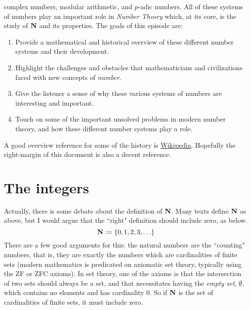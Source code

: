 \documentclass[11pt,oneside]{amsart}
\begin{document}
complex numbers, modular arithmetic, and $p$-adic numbers.  
All of these systems of numbers play an important role in {\em Number Theory} 
which, at its core, is the study of $\mathbf{N}$ and its properties.  
The goals of this episode are:
\begin{enumerate}
	\item Provide a mathematical and historical overview of these different number 
        systems and their development.
	\item Highlight the challenges and obstacles that mathematicians and 
        civilizations faced with new concepts of \emph{number}.
	\item Give the listener a sense of why these various systems of numbers are 
        interesting and important.
	\item Touch on some of the important unsolved problems in modern number 
        theory, and how these different number systems play a role.
\end{enumerate} 
A good overview reference for some of the history is 
  \href{https://en.wikipedia.org/wiki/Number}{Wikipedia}.
Hopefully the right-margin of this document is also a decent reference.

\section{The integers}
Actually, there is some debate about the definition of $\mathbf{N}$.  
Many texts define $\mathbf{N}$ as above, 
  but I would argue that the ``right" definition should include zero, as below.
\[\mathbf{N}:=\{0,1,2,3,\ldots\}\]
There are a few good arguments for this: 
  the natural numbers are the ``counting" numbers, 
  that is, they are exactly the numbers which
  are cardinalities of finite sets
  (modern mathematics is predicated on axiomatic set theory, 
  typically using the ZF or ZFC axioms).
In set theory, one of the axioms is that the intersection of two sets should 
  always be a set, and that necessitates having the {\em empty set}, 
  $\emptyset$,
  which contains no elements and has cardinality $0$.  
  So if $\mathbf{N}$ is the set of cardinalities of finite sets, it must include zero.
\end{document}
